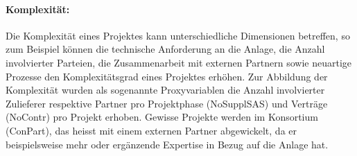 \paragraph{Komplexität:} Die Komplexität eines Projektes kann unterschiedliche Dimensionen betreffen, so zum Beispiel können die technische Anforderung an die Anlage, die Anzahl involvierter Parteien, die Zusammenarbeit mit externen Partnern sowie neuartige Prozesse den Komplexitätsgrad eines Projektes erhöhen. Zur Abbildung der Komplexität wurden als sogenannte Proxyvariablen die Anzahl involvierter Zulieferer respektive Partner pro Projektphase (NoSupplSAS) und Verträge (NoContr) pro Projekt erhoben. Gewisse Projekte werden im Konsortium (ConPart), das heisst mit einem externen Partner abgewickelt, da er beispielsweise mehr oder ergänzende Expertise in Bezug auf die Anlage hat.


